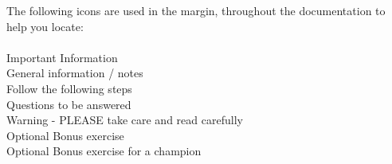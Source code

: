 The following icons are used in the margin, throughout the documentation to help you locate:\\
\\
\hspace*{.2cm} Important Information\\
\hspace*{.2cm} General information / notes\\
\hspace*{.2cm} Follow the following steps\\
\hspace*{.2cm} Questions to be answered\\
\hspace*{.2cm} Warning - PLEASE take care and read carefully\\
\hspace*{.2cm} Optional Bonus exercise\\
\hspace*{.2cm} Optional Bonus exercise for a champion\\

